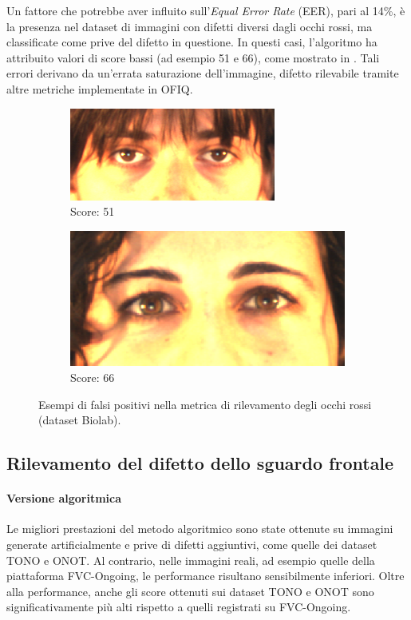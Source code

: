 \documentclass[12pt,a4paper,openright,twoside]{book}
\begin{document}
Un fattore che potrebbe aver influito sull'\textit{Equal Error Rate} (EER), pari al 14\%, è la presenza nel dataset di immagini con difetti diversi dagli occhi rossi, ma classificate come prive del difetto in questione. In questi casi, l'algoritmo ha attribuito valori di score bassi (ad esempio 51 e 66), come mostrato in . Tali errori derivano da un'errata saturazione dell'immagine, difetto rilevabile tramite altre metriche implementate in OFIQ.

\begin{figure}[htbp]
    \centering
    \begin{subfigure}{0.49\textwidth}
        \centering
        \includegraphics[width=.7\linewidth]{figures/red_eye_false_negative_image_1.png}
        \caption{Score: 51}
    \end{subfigure}
    \hfill
    \begin{subfigure}{0.49\textwidth}
        \centering
        \includegraphics[width=.7\linewidth]{figures/red_eye_false_negative_image_2.png}
        \caption{Score: 66}
    \end{subfigure}
    \caption{Esempi di falsi positivi nella metrica di rilevamento degli occhi rossi (dataset Biolab).}
    \label{fig:red_eye_false_negative_images}
\end{figure}

\subsection{Rilevamento del difetto dello sguardo frontale}

\paragraph{Versione algoritmica}
Le migliori prestazioni del metodo algoritmico sono state ottenute su immagini generate artificialmente e prive di difetti aggiuntivi, come quelle dei dataset TONO e ONOT. Al contrario, nelle immagini reali, ad esempio quelle della piattaforma FVC-Ongoing, le performance risultano sensibilmente inferiori.
Oltre alla performance, anche gli score ottenuti sui dataset TONO e ONOT sono significativamente più alti rispetto a quelli registrati su FVC-Ongoing.
\end{document}
